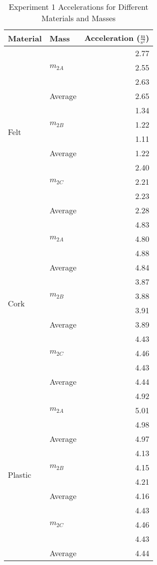 \documentclass [12pt, letterpaper, twoside] {article}
\begin{document}
\begin {table}[h]
  \centering
  \begin {tabular} {| l | l | r |}
    \hline\hline 
    Material & Mass & Acceleration (\(\tfrac{\text{m}}{\text{s}^2}\)) \\
    \hline
    \multirow {12}{*}{Felt} & \multirow {3}{*}{\(m_{2A}\)} & 2.77 \\
    & & 2.55 \\
    & & 2.63 \\
    \cline{2-3}
    & Average & 2.65 \\
    \cline{2-3}
    & \multirow {3}{*}{\(m_{2B}\)} & 1.34 \\
    & & 1.22 \\
    & & 1.11 \\
    \cline{2-3}
    & Average & 1.22 \\ %
    \cline{2-3}
    & \multirow {3}{*}{\(m_{2C}\)} & 2.40 \\
    & & 2.21 \\
    & & 2.23 \\
    \cline{2-3}
    & Average & 2.28 \\
    \hline
    \multirow {12}{*}{Cork} & \multirow {3}{*}{\(m_{2A}\)} & 4.83 \\
    & & 4.80 \\
    & & 4.88 \\
    \cline{2-3}
    & Average & 4.84 \\ %
    \cline{2-3}
    & \multirow {3}{*}{\(m_{2B}\)} & 3.87 \\
    & & 3.88 \\
    & & 3.91 \\
    \cline{2-3}
    & Average & 3.89 \\ %
    \cline{2-3}
    & \multirow {3}{*}{\(m_{2C}\)} & 4.43 \\
    & & 4.46 \\
    & & 4.43 \\
    \cline{2-3}
    & Average & 4.44 \\
    \cline{2-3}
    \hline
    \multirow {12}{*}{Plastic} & \multirow {3}{*}{\(m_{2A}\)} & 4.92 \\
    & & 5.01 \\
    & & 4.98 \\
    \cline{2-3}
    & Average & 4.97 \\
    \cline{2-3}
    & \multirow {3}{*}{\(m_{2B}\)} & 4.13 \\
    & & 4.15 \\
    & & 4.21 \\
    \cline{2-3}
    & Average & 4.16 \\ %
    \cline{2-3}
    & \multirow {3}{*}{\(m_{2C}\)} & 4.43 \\
    & & 4.46 \\
    & & 4.43 \\
    \cline{2-3}
    & Average & 4.44 \\
    \hline\hline
  \end {tabular}
  \caption {Experiment 1 Accelerations for Different Materials and Masses}
\end {table}
\end{document}
